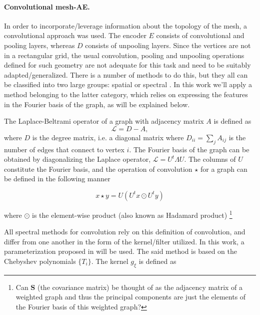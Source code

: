 \documentclass[twocolumn]{llncs}
\begin{document}


\paragraph{Convolutional mesh-AE.}

In order to incorporate/leverage information about the topology of the mesh, a convolutional approach was used.
The encoder $E$ consists of convolutional and pooling layers, whereas $D$ consists of unpooling layers. Since the vertices are not in a rectangular grid, the usual convolution, pooling and unpooling operations defined for such geometry are not adequate for this task and need to be suitably adapted/generalized. There is a number of methods to do this, but they all can be classified into two large groups: spatial or spectral %
. In this work we'll apply a method belonging to the latter category, which relies on expressing the features in the Fourier basis of the graph, as will be explained below.

The Laplace-Beltrami operator of a graph with adjacency matrix $A$ is defined as
\begin{equation}
\mathcal{L}=D-A,
\end{equation}{}
\noindent 
where $D$ is the degree matrix, i.e. a diagonal matrix where $D_{ii}=\sum_{j}A_{ij}$ is the number of edges that connect to vertex $i$. The Fourier basis of the graph can be obtained by diagonalizing the Laplace operator, $\mathcal{L}=U^t\Lambda U$. The columns of $U$ constitute the Fourier basis, and the operation of convolution $\star$ for a graph can be defined in the following manner

\begin{equation}
x\star y =U(U^tx\odot U^ty)
\end{equation}{}

\noindent where $\odot$ is the element-wise product (also known as Hadamard product)
\footnote{Can $\textbf{S}$ (the covariance matrix) be thought of as the adjacency matrix of a weighted graph and thus the principal components are just the elements of the Fourier basis of this weighted graph?}

All spectral methods for convolution rely on this definition of convolution, and differ from one another in the form of the kernel/filter utilized. In this work, a parameterization proposed in %
will be used. 
The said method is based on the Chebyshev polynomials $\{T_i\}$. The kernel $g_\xi$ is defined as
\end{document}
